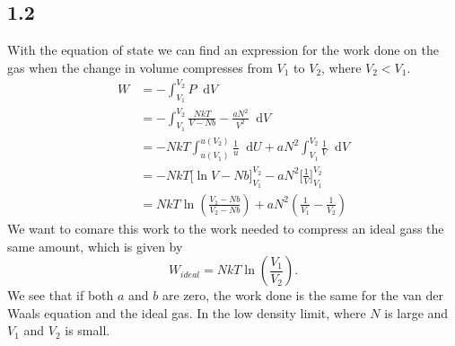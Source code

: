 \documentclass[a4paper,10pt, english]{article}
\newcommand*\diff{\mathop{}\!\mathrm{d}}
\begin{document}
\subsection*{1.2}
With the equation of state we can find an expression for the work done on the gas when the change in volume compresses from $V_1$ to $V_2$, where $V_2<V_1$.
\begin{align*}
    W &= -\int_{V_1}^{V_2}P \diff V \\
      &= -\int_{V_1}^{V_2} \frac{NkT}{V-Nb} - \frac{aN^2}{V^2} \diff V \\
      &= -NkT \int_{u(V_1)}^{u(V_2)}\frac{1}{u}\diff U  + aN^2\int_{V_1}^{V_2}\frac{1}{V}\diff V \\
      &= -NkT\Bigg[\ln{V-Nb}\Bigg]_{V_1}^{V_2}-aN^2\Bigg[\frac{1}{V}\Bigg]_{V_1}^{V_2} \\
      &= NkT\ln{\left(\frac{V_1-Nb}{V_2-Nb}\right)}+aN^2\left(\frac{1}{V_1}-\frac{1}{V_2}\right)
\end{align*}
We want to comare this work to the work needed to compress an ideal gass the same amount, which is given by
\begin{equation}
    W_{ideal} = NkT\ln{\left(\frac{V_1}{V_2}\right)}.
\end{equation}
We see that if both $a$ and $b$ are zero, the work done is the same for the van der Waals equation and the ideal gas. In the low density limit, where $N$ is large and $V_1$ and $V_2$ is small.
\end{document}
